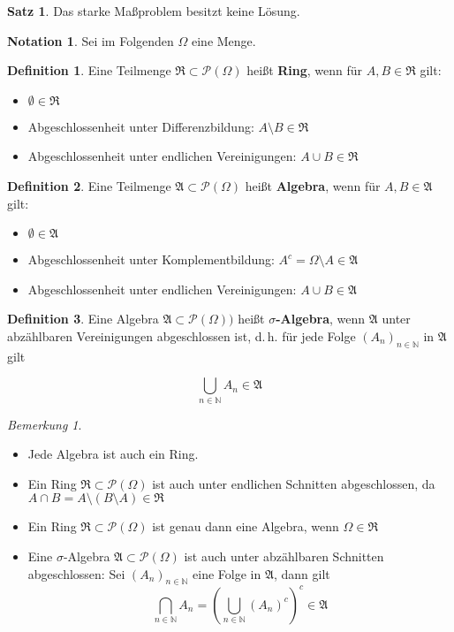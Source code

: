 \documentclass[a4paper,10pt,landscape]{article}
\newcommand{\N}{\mathbb{N}}
\newcommand{\PS}{\mathcal{P}} %
\newcommand{\PSO}{\PS(\Omega)} %
\newcommand{\Alg}{\mathfrak{A}}
\newcommand{\Ring}{\mathfrak{R}}
\theoremstyle{definition}
\newtheorem*{nota}{Notation}
\newtheorem*{defn}{Definition}
\newtheorem*{satz}{Satz}
\theoremstyle{remark}
\newtheorem*{bem}{Bemerkung}
\renewcommand{\emph}[1]{\textcolor{Emph}{\bf{#1}}}
\begin{document}
\begin{multicols}{3}
\begin{satz}
  Das starke Maßproblem besitzt keine Lösung.
\end{satz}

\begin{nota}
  Sei im Folgenden $\Omega$ eine Menge.
\end{nota}

\begin{defn}
  Eine Teilmenge $\Ring \subset \PSO$ heißt \emph{Ring}, wenn für $A, B \in \Ring$ gilt:
  \begin{itemize}
    \item $\emptyset \in \Ring$
    \item Abgeschlossenheit unter Differenzbildung: $A \setminus B \in \Ring$
    \item Abgeschlossenheit unter endlichen Vereinigungen: $A \cup B \in \Ring$
  \end{itemize}
\end{defn}

\begin{defn}
  Eine Teilmenge $\Alg \subset \PSO$ heißt \emph{Algebra}, wenn für $A, B \in \Alg$ gilt:
  \begin{itemize}
    \item $\emptyset \in \Alg$
    \item Abgeschlossenheit unter Komplementbildung: $A^c = \Omega \setminus A \in \Alg$
    \item Abgeschlossenheit unter endlichen Vereinigungen: $A \cup B \in \Alg$
  \end{itemize}
\end{defn}

\begin{defn}
  Eine Algebra $\Alg \subset \PSO)$ heißt \emph{$\sigma$-Algebra}, wenn $\Alg$ unter abzählbaren Vereinigungen abgeschlossen ist, d.\,h. für jede Folge $(A_n)_{n \in \N}$ in $\Alg$ gilt

  \[ \bigcup_{n \in \N} A_n \in \Alg \]
\end{defn}

\begin{bem}
  \begin{itemize}
    \item Jede Algebra ist auch ein Ring.
    \item Ein Ring $\Ring \subset \PSO$ ist auch unter endlichen Schnitten abgeschlossen, da $A \cap B = A \setminus (B \setminus A) \in \Ring$
    \item Ein Ring $\Ring \subset \PSO$ ist genau dann eine Algebra, wenn $\Omega \in \Ring$
    \item Eine $\sigma$-Algebra $\Alg \subset \PSO$ ist auch unter abzählbaren Schnitten abgeschlossen: Sei $(A_n)_{n \in \N}$ eine Folge in $\Alg$, dann gilt
      \[ \bigcap_{n \in \N} A_n = \left( \bigcup_{n \in \N} (A_n)^c \right)^c \in \Alg \]
  \end{itemize}
\end{bem}


\end{multicols}
\end{document}
